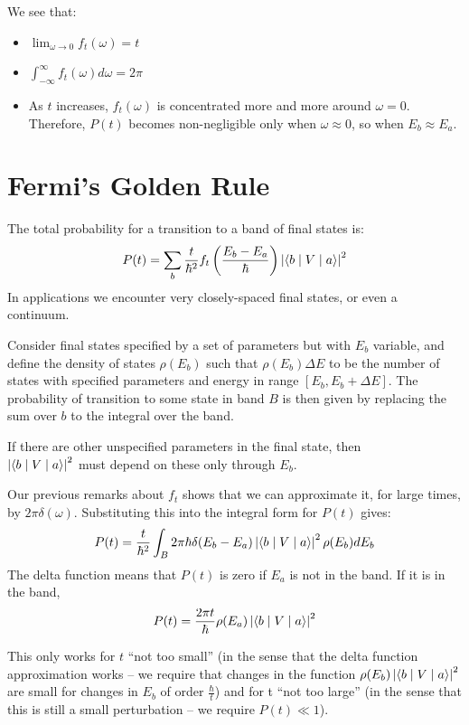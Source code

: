\documentclass[../Main.tex]{subfiles}
\begin{document}
We see that:
\begin{itemize}
    \item $\lim_{\omega \to 0} f_t(\omega) = t$
    \item $\int_{-\infty}^{\infty} f_t(\omega) d\omega = 2\pi$
    \item As $t$ increases, $f_t(\omega)$ is concentrated more and more around $\omega = 0$. Therefore, $P(t)$ becomes non-negligible only when $\omega \approx 0$, so when $E_b \approx E_a$.
\end{itemize}
\section{Fermi's Golden Rule}
The total probability for a transition to a band of final states is:
\begin{equation*}
    P(t) = \sum_b \frac{t}{\hbar^2} f_t\left(\frac{E_b - E_a}{\hbar}\right) \left|\langle b\mid V\mid a\rangle\right|^2
\end{equation*}
In applications we encounter very closely-spaced final states, or even a continuum.

Consider final states specified by a set of parameters but with $E_b$ variable, and define the density of states $\rho(E_b)$ such that $\rho(E_b) \Delta E$ to be the number of states with specified parameters and energy in range $[E_b, E_b + \Delta E]$. The probability of transition to some state in band $B$ is then given by replacing the sum over $b$ to the integral over the band.

If there are other unspecified parameters in the final state, then\\$\left|\langle b\mid V\mid a\rangle\right|^2$ must depend on these only through $E_b$.

Our previous remarks about $f_t$ shows that we can approximate it, for large times, by $2\pi \delta(\omega)$. Substituting this into the integral form for $P(t)$ gives:
\begin{equation*}
    P(t) = \frac{t}{\hbar^2} \int_B 2\pi \hbar \delta(E_b - E_a) \left|\langle b\mid V\mid a\rangle\right|^2 \rho(E_b) dE_b
\end{equation*}
The delta function means that $P(t)$ is zero if $E_a$ is not in the band. If it is in the band,
\begin{equation*}
    P(t) = \frac{2\pi t}{\hbar} \rho(E_a) \left|\langle b\mid V\mid a\rangle\right|^2
\end{equation*}
\begin{remark}
    \label{remTimeBounds}
    This only works for $t$ ``not too small'' (in the sense that the delta function approximation works -- we require that changes in the function $\rho(E_b) \left|\langle b\mid V\mid a\rangle\right|^2$ are small for changes in $E_b$ of order $\frac\hbar t$) and for t ``not too large'' (in the sense that this is still a small perturbation -- we require $P(t) \ll 1$).
\end{remark}
\end{document}
